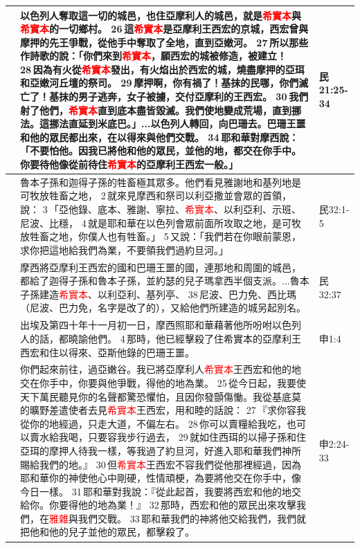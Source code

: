 \begin{table}[H]
\centering 
\begin{tabular}{p{}|p{14cm}|p{1.5cm}}\hline\hline
&以色列人奪取這一切的城邑，也住亞摩利人的城邑，就是\textcolor{red}{希實本}與\textcolor{red}{希實本}的一切鄉村。 26 這\textcolor{red}{希實本}是亞摩利王西宏的京城，西宏曾與摩押的先王爭戰，從他手中奪取了全地，直到亞嫩河。 27 所以那些作詩歌的說：「你們來到\textcolor{red}{希實本}，願西宏的城被修造，被建立！ 28 因為有火從\textcolor{red}{希實本}發出，有火焰出於西宏的城，燒盡摩押的亞珥和亞嫩河丘壇的祭司。 29 摩押啊，你有禍了！基抹的民哪，你們滅亡了！基抹的男子逃奔，女子被擄，交付亞摩利的王西宏。 30 我們射了他們，\textcolor{red}{希實本}直到底本盡皆毀滅。我們使地變成荒場，直到挪法。這挪法直延到米底巴。」...以色列人轉回，向巴珊去。巴珊王噩和他的眾民都出來，在以得來與他們交戰。 34 耶和華對摩西說：「不要怕他。因我已將他和他的眾民，並他的地，都交在你手中。你要待他像從前待住\textcolor{red}{希實本}的亞摩利王西宏一般。」&民21:25-34\\\hline
&魯本子孫和迦得子孫的牲畜極其眾多。他們看見雅謝地和基列地是可牧放牲畜之地， 2 就來見摩西和祭司以利亞撒並會眾的首領，說： 3 「亞他錄、底本、雅謝、寧拉、\textcolor{red}{希實本}、以利亞利、示班、尼波、比穩， 4 就是耶和華在以色列會眾前面所攻取之地，是可牧放牲畜之地，你僕人也有牲畜。」 5 又說：「我們若在你眼前蒙恩，求你把這地給我們為業，不要領我們過約旦河。」&民32:1-5\\\hline
&摩西將亞摩利王西宏的國和巴珊王噩的國，連那地和周圍的城邑，都給了迦得子孫和魯本子孫，並約瑟的兒子瑪拿西半個支派。...魯本子孫建造\textcolor{red}{希實本}、以利亞利、基列亭、 38 尼波、巴力免、西比瑪（尼波、巴力免，名字是改了的），又給他們所建造的城另起別名。&民32:37\\\hline
&出埃及第四十年十一月初一日，摩西照耶和華藉著他所吩咐以色列人的話，都曉諭他們。 4 那時，他已經擊殺了住希實本的亞摩利王西宏和住以得來、亞斯他錄的巴珊王噩。&申1:4\\\hline
&你們起來前往，過亞嫩谷。我已將亞摩利人\textcolor{red}{希實本}王西宏和他的地交在你手中，你要與他爭戰，得他的地為業。 25 從今日起，我要使天下萬民聽見你的名聲都驚恐懼怕，且因你發顫傷慟。我從基底莫的曠野差遣使者去見\textcolor{red}{希實本}王西宏，用和睦的話說： 27 『求你容我從你的地經過，只走大道，不偏左右。 28 你可以賣糧給我吃，也可以賣水給我喝，只要容我步行過去， 29 就如住西珥的以掃子孫和住亞珥的摩押人待我一樣，等我過了約旦河，好進入耶和華我們神所賜給我們的地。』 30 但\textcolor{red}{希實本}王西宏不容我們從他那裡經過，因為耶和華你的神使他心中剛硬，性情頑梗，為要將他交在你手中，像今日一樣。 31 耶和華對我說：『從此起首，我要將西宏和他的地交給你。你要得他的地為業！』 32 那時，西宏和他的眾民出來攻擊我們，在\textcolor{red}{雅雜}與我們交戰。 33 耶和華我們的神將他交給我們，我們就把他和他的兒子並他的眾民，都擊殺了。&申2:24-33\\\hline

\end{tabular}
\end{table}
